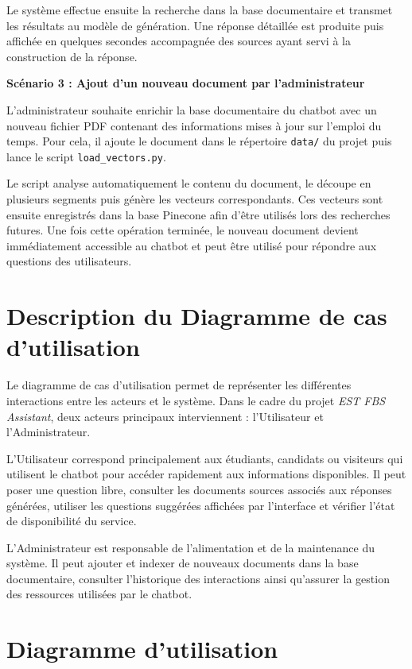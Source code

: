 \documentclass[12pt,a4paper]{report}
\begin{document}
Le système effectue ensuite la recherche dans la base documentaire et transmet les résultats au modèle de génération. Une réponse détaillée est produite puis affichée en quelques secondes accompagnée des sources ayant servi à la construction de la réponse.

\bigskip

\textbf{Scénario 3 : Ajout d'un nouveau document par l'administrateur}

L'administrateur souhaite enrichir la base documentaire du chatbot avec un nouveau fichier PDF contenant des informations mises à jour sur l'emploi du temps. Pour cela, il ajoute le document dans le répertoire \texttt{data/} du projet puis lance le script \texttt{load\_vectors.py}. 
\newline

Le script analyse automatiquement le contenu du document, le découpe en plusieurs segments puis génère les vecteurs correspondants. Ces vecteurs sont ensuite enregistrés dans la base Pinecone afin d'être utilisés lors des recherches futures. Une fois cette opération terminée, le nouveau document devient immédiatement accessible au chatbot et peut être utilisé pour répondre aux questions des utilisateurs.
\newpage
\section{Description du Diagramme de cas d'utilisation}


Le diagramme de cas d’utilisation permet de représenter les différentes interactions entre les acteurs et le système. Dans le cadre du projet \textit{EST FBS Assistant}, deux acteurs principaux interviennent : l’Utilisateur et l’Administrateur.

L’Utilisateur correspond principalement aux étudiants, candidats ou visiteurs qui utilisent le chatbot pour accéder rapidement aux informations disponibles. Il peut poser une question libre, consulter les documents sources associés aux réponses générées, utiliser les questions suggérées affichées par l’interface et vérifier l’état de disponibilité du service.

L’Administrateur est responsable de l’alimentation et de la maintenance du système. Il peut ajouter et indexer de nouveaux documents dans la base documentaire, consulter l’historique des interactions ainsi qu’assurer la gestion des ressources utilisées par le chatbot.
\newpage
\section{Diagramme d'utilisation}
\newline
\end{document}

